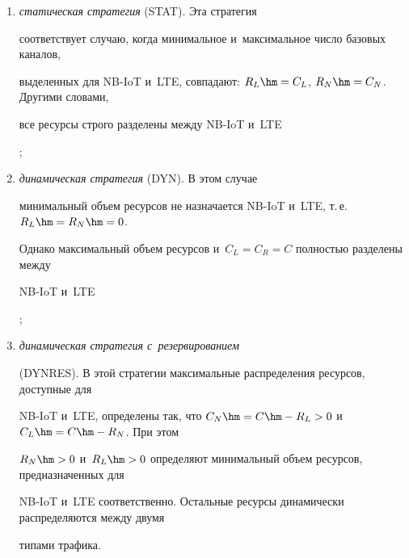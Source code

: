 \begin{enumerate}[(1)]


    \item{\textit {статическая стратегия} ({STAT}). Эта стратегия 


соответствует случаю, когда минимальное и~максимальное число базовых каналов, 


выделенных для NB-IoT и~LTE, совпадают: $R_L\hm=C_L$, $R_N\hm=C_N$. Другими словами, 


все ресурсы строго разделены между NB-IoT и~LTE};


    \item {\textit {динамическая стратегия} ({DYN}). В этом случае 


минимальный объем ресурсов не назначается NB-IoT и~LTE, т.\,е.\ $R_L\hm=R_N\hm=0$. 


Однако максимальный объем ресурсов и~$C_L=C_R= C$ полностью разделены между 


NB-IoT и~LTE};


    \item{\textit {динамическая стратегия с~резервированием} 


    ({DYNRES}). В этой стратегии максимальные распределения ресурсов, доступные для 


NB-IoT и~LTE, определены так, что $C_N\hm=C\hm-R_L> 0$ и~$C_L\hm=C\hm-R_N$. При этом 


$R_N\hm>  0$ и~$R_L\hm> 0$ определяют минимальный объем ресурсов, предназначенных для 


NB-IoT и~LTE соответственно. Остальные ресурсы динамически распределяются между двумя 


типами трафика.}


\end{enumerate}





